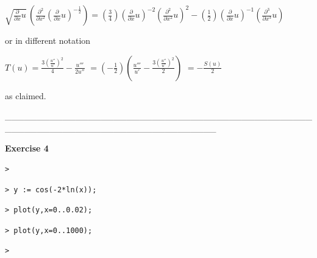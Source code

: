 \documentclass{article}
\begin{document}
\begin{Maple Normal}

\end{Maple Normal}
\begin{center}
$\displaystyle \sqrt{\frac{\partial}{\partial x} u}\, (\frac{\partial^{2}}{\partial x^{2}} (\frac{\partial}{\partial x} u)^{-\frac{1}{2}})=(\frac{3}{4}) (\frac{\partial}{\partial x} u)^{-2} (\frac{\partial^{2}}{\partial x^{2}} u)^{2}-(\frac{1}{2}) (\frac{\partial}{\partial x} u)^{-1} (\frac{\partial^{3}}{\partial x^{3}} u)$\end{center}
\begin{Maple Normal}

\end{Maple Normal}
\begin{Maple Normal}
or in different notation
\end{Maple Normal}
\begin{Maple Normal}

\end{Maple Normal}
\begin{center}

$T (u)=\frac{3 (\frac{\mathit{u''}}{\mathit{u'}})^{2}}{4}-\frac{\mathit{u'''}}{2 \mathit{u''}}$
$=(-\frac{1}{2}) (\frac{\mathit{u'''}}{\mathit{u'}}-\frac{3 (\frac{\mathit{u''}}{\mathit{u'}})^{2}}{2})$
$=-\frac{S (u)}{2}$\end{center}
\begin{Maple Normal}
as claimed.
\end{Maple Normal}
\begin{Maple Normal}
\_\_\_\_\_\_\_\_\_\_\_\_\_\_\_\_\_\_\_\_\_\_\_\_\_\_\_\_\_\_\_\_\_\_\_\_\_\_\_\_\_\_\_\_\_\_\_\_\_\_\_\_\_\_\_\_\_\_\_\_\_\_\_\_\_\_\_\_\_\_\_\_\_\_\_\_\_\_\_\_\_
\end{Maple Normal}
\begin{Maple Normal}
\textbf{Exercise 4}
\end{Maple Normal}
\begin{lstlisting}
> 
\end{lstlisting}
\begin{lstlisting}
> y := cos(-2*ln(x));
\end{lstlisting}
\begin{lstlisting}
> plot(y,x=0..0.02);
\end{lstlisting}
\begin{lstlisting}
> plot(y,x=0..1000);
\end{lstlisting}
\begin{lstlisting}
> 
\end{lstlisting}
\end{document}
